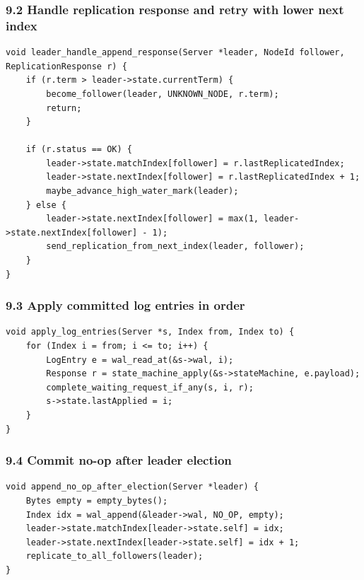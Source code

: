 \documentclass[10pt,letterpaper]{article}
\begin{document}
\subsubsection*{9.2 Handle replication response and retry with lower next index}

\begin{verbatim}
void leader_handle_append_response(Server *leader, NodeId follower, ReplicationResponse r) {
    if (r.term > leader->state.currentTerm) {
        become_follower(leader, UNKNOWN_NODE, r.term);
        return;
    }

    if (r.status == OK) {
        leader->state.matchIndex[follower] = r.lastReplicatedIndex;
        leader->state.nextIndex[follower] = r.lastReplicatedIndex + 1;
        maybe_advance_high_water_mark(leader);
    } else {
        leader->state.nextIndex[follower] = max(1, leader->state.nextIndex[follower] - 1);
        send_replication_from_next_index(leader, follower);
    }
}
\end{verbatim}

\subsubsection*{9.3 Apply committed log entries in order}

\begin{verbatim}
void apply_log_entries(Server *s, Index from, Index to) {
    for (Index i = from; i <= to; i++) {
        LogEntry e = wal_read_at(&s->wal, i);
        Response r = state_machine_apply(&s->stateMachine, e.payload);
        complete_waiting_request_if_any(s, i, r);
        s->state.lastApplied = i;
    }
}
\end{verbatim}

\subsubsection*{9.4 Commit no-op after leader election}

\begin{verbatim}
void append_no_op_after_election(Server *leader) {
    Bytes empty = empty_bytes();
    Index idx = wal_append(&leader->wal, NO_OP, empty);
    leader->state.matchIndex[leader->state.self] = idx;
    leader->state.nextIndex[leader->state.self] = idx + 1;
    replicate_to_all_followers(leader);
}
\end{verbatim}
\end{document}
